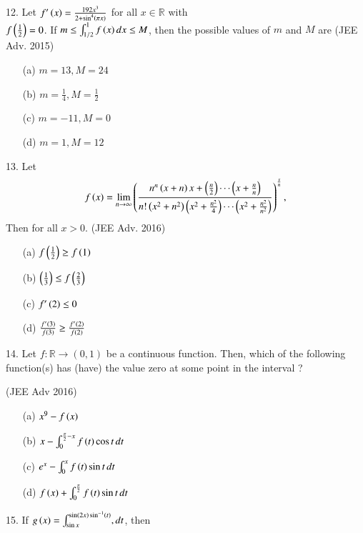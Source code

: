 \documentclass[journal,12pt,twocolumn]{IEEEtran}
\theoremstyle{remark}
\begin{document}
12. Let $f'\left(x\right) = \frac{192x^3}{2 + \sin^4\left(\pi x\right)}$ for all $x \in \mathbb{R}$ with \\ $f\left(\frac{1}{2}\right) = 0$.
If $m \leq \int_{1/2}^{1} f\left(x\right) dx \leq M$, then the possible values of $m$ and $M$ are \hfill (JEE Adv. 2015)
\begin{multicols}{2}
\begin{enumerate}
\item [(a)] $m = 13, M = 24$
\item [(b)] $m = \frac{1}{4}, M = \frac{1}{2}$
\columnbreak
\item [(c)] $m = -11, M = 0$
\item [(d)] $m = 1, M = 12$
\end{enumerate}
\end{multicols}
13. Let
\begin{align*}
f\left(x\right) = \lim_{n \to \infty}  \left(\frac{n^n \left(x+n\right) x +\left(\frac{n}{2}\right) \cdots \left(x + \frac{n}{n}\right)}{n!\left( x^2 + n^2\right) \left(x^2 + \frac{n^2}{4}\right) \cdots \left(x^2 + \frac{n^2}{n^2}\right)}\right) ^{\frac{x}{n}},
\end{align*}
Then  for all  $x > 0$. \hfill (JEE Adv. 2016)
\begin{multicols}{2}
\begin{enumerate}
\item[(a)] $f\left(\frac{1}{2}\right) \geq f\left(1\right)$
\item[(b)] $\left(\frac{1}{3} \right)\leq f\left(\frac{2}{3}\right)$
\columnbreak
\item [(c)] $f'\left(2\right) \leq 0$
\item [(d)] $\frac{f'\left(3\right)}{f\left(3\right)} \geq \frac{f'\left(2\right)}{f\left(2\right)}$
\end{enumerate}
\end{multicols}
14. Let $f: \mathbb{R} \to (0,1)$ be a continuous function. Then, which of the following function(s) has (have) the value zero at some point in the interval ?

\hfill (JEE Adv 2016)
\begin{multicols}{2}
\begin{enumerate}
\item[(a)] $x^9 - f\left(x\right)$
\item[(b)] $x - \int_{0}^{\frac{\pi}{2} - x} f\left(t\right) \cos t \, dt$
\columnbreak
\item[(c)] $e^x - \int_{0}^{x} f\left(t\right) \sin t \, dt$
\item[(d)] $f\left(x\right) + \int_{0}^{\frac{\pi}{2}} f\left(t\right) \sin t \, dt$
\end{enumerate}
\end{multicols}
15. If $g\left(x\right) = \int_{\sin x}^{\sin\left(2x\right) \sin^{-1}\left(t\right) }, dt$, then
\end{document}
